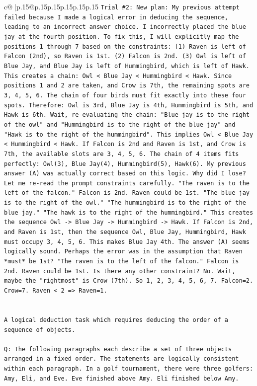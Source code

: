 \documentclass{article}
\begin{document}
{\begin{supertabular}{c@{$\;$}|p{.15\linewidth}@{}p{.15\linewidth}p{.15\linewidth}p{.15\linewidth}p{.15\linewidth}p{.15\linewidth}}
{{{\texttt{Trial \#2: New plan: My previous attempt failed because I made a logical error in deducing the sequence, leading to an incorrect answer choice. I incorrectly placed the blue jay at the fourth position. To fix this, I will explicitly map the positions 1 through 7 based on the constraints: (1) Raven is left of Falcon (2nd), so Raven is 1st. (2) Falcon is 2nd. (3) Owl is left of Blue Jay, and Blue Jay is left of Hummingbird, which is left of Hawk. This creates a chain: Owl < Blue Jay < Hummingbird < Hawk. Since positions 1 and 2 are taken, and Crow is 7th, the remaining spots are 3, 4, 5, 6. The chain of four birds must fit exactly into these four spots. Therefore: Owl is 3rd, Blue Jay is 4th, Hummingbird is 5th, and Hawk is 6th. Wait, re{-}evaluating the chain: "Blue jay is to the right of the owl" and "Hummingbird is to the right of the blue jay" and "Hawk is to the right of the hummingbird". This implies Owl < Blue Jay < Hummingbird < Hawk. If Falcon is 2nd and Raven is 1st, and Crow is 7th, the available slots are 3, 4, 5, 6. The chain of 4 items fits perfectly: Owl(3), Blue Jay(4), Hummingbird(5), Hawk(6). My previous answer (A) was actually correct based on this logic. Why did I lose? Let me re{-}read the prompt constraints carefully. "The raven is to the left of the falcon." Falcon is 2nd. Raven could be 1st. "The blue jay is to the right of the owl." "The hummingbird is to the right of the blue jay." "The hawk is to the right of the hummingbird." This creates the sequence Owl {-}> Blue Jay {-}> Hummingbird {-}> Hawk. If Falcon is 2nd, and Raven is 1st, then the sequence Owl, Blue Jay, Hummingbird, Hawk must occupy 3, 4, 5, 6. This makes Blue Jay 4th. The answer (A) seems logically sound. Perhaps the error was in the assumption that Raven *must* be 1st? "The raven is to the left of the falcon." Falcon is 2nd. Raven could be 1st. Is there any other constraint? No. Wait, maybe the "rightmost" is Crow (7th). So 1, 2, 3, 4, 5, 6, 7. Falcon=2. Crow=7. Raven < 2 => Raven=1.} \\
\\ 
\\ 
\texttt{A logical deduction task which requires deducing the order of a sequence of objects.} \\
\\ 
\texttt{Q: The following paragraphs each describe a set of three objects arranged in a fixed order. The statements are logically consistent within each paragraph. In a golf tournament, there were three golfers: Amy, Eli, and Eve. Eve finished above Amy. Eli finished below Amy.} \\
}}}
\end{supertabular}}
\end{document}
